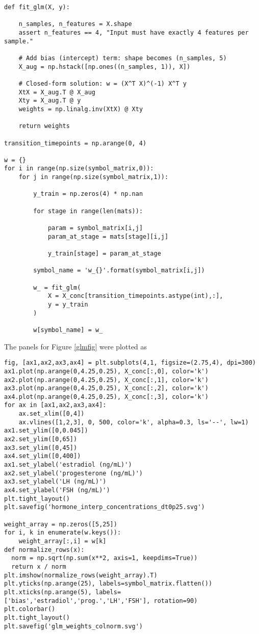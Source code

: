 \documentclass[11pt]{article}
\begin{document}
\begin{Verbatim}[frame=single]
def fit_glm(X, y):

    n_samples, n_features = X.shape
    assert n_features == 4, "Input must have exactly 4 features per sample."

    # Add bias (intercept) term: shape becomes (n_samples, 5)
    X_aug = np.hstack([np.ones((n_samples, 1)), X])
    
    # Closed-form solution: w = (X^T X)^(-1) X^T y
    XtX = X_aug.T @ X_aug
    Xty = X_aug.T @ y
    weights = np.linalg.inv(XtX) @ Xty
    
    return weights
    
transition_timepoints = np.arange(0, 4)

w = {}
for i in range(np.size(symbol_matrix,0)):
    for j in range(np.size(symbol_matrix,1)):

        y_train = np.zeros(4) * np.nan

        for stage in range(len(mats)):

            param = symbol_matrix[i,j]
            param_at_stage = mats[stage][i,j]

            y_train[stage] = param_at_stage

        symbol_name = 'w_{}'.format(symbol_matrix[i,j])

        w_ = fit_glm(
            X = X_conc[transition_timepoints.astype(int),:],
            y = y_train
        )

        w[symbol_name] = w_
\end{Verbatim}
The panels for Figure \ref{glmfig} were plotted as
\begin{Verbatim}[frame=single]
fig, [ax1,ax2,ax3,ax4] = plt.subplots(4,1, figsize=(2.75,4), dpi=300)
ax1.plot(np.arange(0,4.25,0.25), X_conc[:,0], color='k')
ax2.plot(np.arange(0,4.25,0.25), X_conc[:,1], color='k')
ax3.plot(np.arange(0,4.25,0.25), X_conc[:,2], color='k')
ax4.plot(np.arange(0,4.25,0.25), X_conc[:,3], color='k')
for ax in [ax1,ax2,ax3,ax4]:
    ax.set_xlim([0,4])
    ax.vlines([1,2,3], 0, 500, color='k', alpha=0.3, ls='--', lw=1)
ax1.set_ylim([0,0.045])
ax2.set_ylim([0,65])
ax3.set_ylim([0,45])
ax4.set_ylim([0,400])
ax1.set_ylabel('estradiol (ng/mL)')
ax2.set_ylabel('progesterone (ng/mL)')
ax3.set_ylabel('LH (ng/mL)')
ax4.set_ylabel('FSH (ng/mL)')
plt.tight_layout()
plt.savefig('hormone_interp_concentrations_dt0p25.svg')

weight_array = np.zeros([5,25])
for i, k in enumerate(w.keys()):
    weight_array[:,i] = w[k]
def normalize_rows(x):
  norm = np.sqrt(np.sum(x**2, axis=1, keepdims=True))
  return x / norm
plt.imshow(normalize_rows(weight_array).T)
plt.yticks(np.arange(25), labels=symbol_matrix.flatten())
plt.xticks(np.arange(5), labels=['bias','estradiol','prog.','LH','FSH'], rotation=90)
plt.colorbar()
plt.tight_layout()
plt.savefig('glm_weights_colnorm.svg')
\end{Verbatim}
\end{document}
